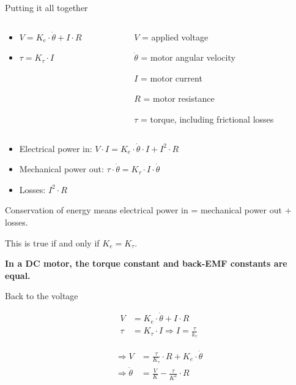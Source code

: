 \documentclass[compress]{beamer}
\begin{document}
\begin{frame}{Putting it all together}

    \begin{columns}
        \begin{column}{0.5\linewidth}

    \begin{itemize}
        \item $V = K_e \cdot \dot\theta + I \cdot R$
        \item $\tau = K_\tau \cdot I$

    \end{itemize}
        \end{column}
        \begin{column}{0.5\linewidth}
    $V$ = applied voltage
            
    $\dot\theta$ = motor angular velocity
            
    $I$ = motor current
    
    $R$ = motor resistance
    
    $\tau$ = torque, including frictional losses
        \end{column}
    \end{columns}


    \pause 

    \begin{itemize}
        \item Electrical power in: $V \cdot I = K_e \cdot \dot\theta \cdot I + I^2 \cdot R$
        \item Mechanical power out: $\tau \cdot \dot\theta = K_\tau \cdot I \cdot \dot\theta$
        \item Losses: $I^2 \cdot R$
    \end{itemize}

    \pause

    Conservation of energy means electrical power in = mechanical power out +
    losses.

    This is true if and only if $K_e=K_\tau$.

    \pause

    \textbf{In a DC motor, the torque constant and back-EMF constants are equal.}
\end{frame}

\begin{frame}{Back to the voltage}


\begin{align*}
    V &= K_e \cdot \dot\theta + I \cdot R \\
    \tau &= K_\tau \cdot I \Rightarrow I = \frac{\tau}{k_\tau}
\end{align*}

\begin{equation*}
\begin{split}
    \Rightarrow V &= \frac{\tau}{K_\tau} \cdot R + K_e \cdot \dot\theta \\
    \Rightarrow \dot\theta &= \frac{V}{K} - \frac{\tau}{K^2} \cdot R
\end{split}
\end{equation*}

\end{frame}
\end{document}
